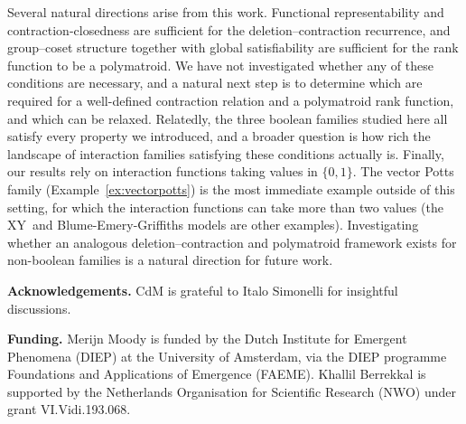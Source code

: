 \documentclass[11pt,reqno]{amsart}
\newenvironment{ack}
  {\par\medskip\noindent\textbf{Acknowledgements.}\enskip\ignorespaces}{\par}
\newenvironment{funding}
  {\par\medskip\noindent\textbf{Funding.}\enskip\ignorespaces}{\par}
\theoremstyle{plain}
\theoremstyle{definition}
\numberwithin{equation}{section}
\begin{document}
Several natural directions arise from this work. Functional representability and con\-traction-closedness are sufficient for the deletion--contraction recurrence, and group--coset structure together with global satisfiability are sufficient for the rank function to be a polymatroid. We have not investigated whether any of these conditions are necessary, and a natural next step is to determine which are required for a well-defined contraction relation and a polymatroid rank function, and which can be relaxed. Relatedly, the three boolean families studied here all satisfy every property we introduced, and a broader question is how rich the landscape of interaction families satisfying these conditions actually is. Finally, our results rely on interaction functions taking values in $\{0,1\}$. 
The vector Potts family (Example~\ref{ex:vectorpotts}) is the most immediate example outside of this setting, for which the interaction functions can take more than two values (the XY~and Blume-Emery-Griffiths models are other examples).
Investigating whether an analogous deletion--contraction and polymatroid framework exists for non-boolean families is a natural direction for future work.

\begin{ack}
CdM is grateful to Italo Simonelli for insightful discussions.
\end{ack}

\begin{funding}
Merijn Moody is funded by the Dutch Institute for Emergent Phenomena (DIEP)
at the University of Amsterdam, via the DIEP programme Foundations and Applications of Emergence (FAEME). Khallil Berrekkal is supported by the Netherlands Organisation for Scientific Research (NWO) under grant VI.Vidi.193.068.
\end{funding}

 
 
\end{document}
